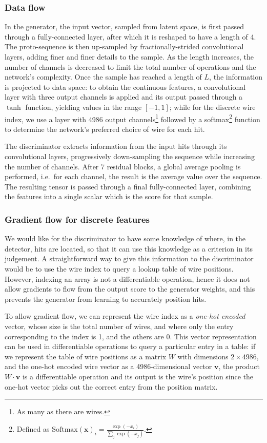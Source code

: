 \subsubsection{Data flow}
In the generator, the input vector, sampled from latent space, is first passed
through a fully-connected layer, after which it is reshaped to have a length of
4. The proto-sequence is then up-sampled by fractionally-strided convolutional
layers, adding finer and finer details to the sample. As the length increases,
the number of channels is decreased to limit the total number of operations and
the network's complexity. Once the sample has reached a length of $L$, the
information is projected to data space: to obtain the continuous features, a
convolutional layer with three output channels is applied and its output passed
through a $\tanh$ function, yielding values in the range $[-1, 1]$; while for
the discrete wire index, we use a layer with 4986 output channels\footnote{As
many as there are wires.} followed by a softmax\footnote{Defined as
$\mathrm{Softmax}(\bm{x})_i = \frac{\exp(-x_i)}{\sum_j \exp(-x_j)}.$}
function to determine the network's preferred choice of wire for each hit.

The discriminator extracts information from the input hits through its
convolutional layers, progressively down-sampling the sequence while increasing
the number of channels. After 7 residual blocks, a global average pooling is
performed, i.e.\ for each channel, the result is the average value over the
sequence. The resulting tensor is passed through a final fully-connected layer,
combining the features into a single scalar which is the score for that sample.

\subsubsection{Gradient flow for discrete features}
We would like for the discriminator to have some knowledge of where, in the
detector, hits are located, so that it can use this knowledge as a criterion in
its judgement. A straightforward way to give this information to the
discriminator would be to use the wire index to query a lookup table of wire
positions. However, indexing an array is not a differentiable operation, hence
it does not allow gradients to flow from the output score to the generator
weights, and this prevents the generator from learning to accurately position
hits.

To allow gradient flow, we can represent the wire index as a \emph{one-hot
encoded} vector, whose size is the total number of wires, and where only the
entry corresponding to the index is 1, and the others are 0. This vector
representation can be used in differentiable operations to query a particular
entry in a table: if we represent the table of wire positions as a matrix $W$
with dimensions $2 \times 4986$, and the one-hot encoded wire vector as a
4986-dimensional vector $\bm{v}$, the product $W \cdot \bm{v}$ is a
differentiable operation and its output is the wire's position since the one-hot
vector picks out the correct entry from the position matrix.

